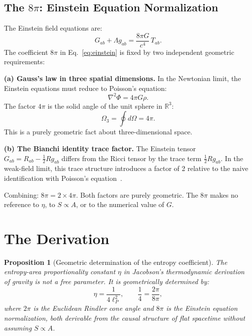 \documentclass[12pt,a4paper]{article}
\newtheorem{proposition}{Proposition}
\begin{document}
\subsection{The $8\pi$: Einstein Equation Normalization}

The Einstein field equations are:
\begin{equation}
G_{ab} + \Lambda g_{ab} = \frac{8\pi G}{c^4}\,T_{ab}.
\label{eq:einstein}
\end{equation}
The coefficient $8\pi$ in Eq.~\eqref{eq:einstein} is fixed by two
independent geometric requirements:

\textbf{(a) Gauss's law in three spatial dimensions.}
In the Newtonian limit, the Einstein equations must reduce to Poisson's
equation:
\begin{equation}
\nabla^2\Phi = 4\pi G\rho.
\label{eq:poisson}
\end{equation}
The factor $4\pi$ is the solid angle of the unit sphere in
$\mathbb{R}^3$:
\begin{equation}
\Omega_3 = \oint d\Omega = 4\pi.
\label{eq:solid_angle}
\end{equation}
This is a purely geometric fact about three-dimensional space.

\textbf{(b) The Bianchi identity trace factor.}
The Einstein tensor $G_{ab} = R_{ab} - \frac{1}{2}Rg_{ab}$ differs
from the Ricci tensor by the trace term $\frac{1}{2}Rg_{ab}$. In the
weak-field limit, this trace structure introduces a factor of 2 relative
to the naive identification with Poisson's equation~\citep{Wald1984}.

Combining: $8\pi = 2 \times 4\pi$. Both factors are purely geometric.
The $8\pi$ makes no reference to $\eta$, to $S \propto A$, or to the
numerical value of $G$.

\section{The Derivation}
\label{sec:derivation}

\begin{mdframed}
\begin{proposition}[Geometric determination of the entropy coefficient]
\label{prop:main}
The entropy-area proportionality constant $\eta$ in Jacobson's
thermodynamic derivation of gravity is not a free parameter. It is
geometrically determined by:
\begin{equation}
\eta = \frac{1}{4\ell_P^2},
\qquad
\frac{1}{4} = \frac{2\pi}{8\pi},
\label{eq:eta_geometric}
\end{equation}
where $2\pi$ is the Euclidean Rindler cone angle and $8\pi$ is the
Einstein equation normalization, both derivable from the causal
structure of flat spacetime without assuming $S \propto A$.
\end{proposition}
\end{mdframed}
\end{document}
